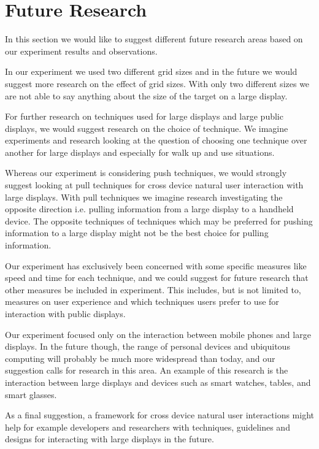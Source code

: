 \section{Future Research} \label{sec:futureresearch}
In this section we would like to suggest different future research areas based on our experiment results and observations.

In our experiment we used two different grid sizes and in the future we would suggest more research on the effect of grid sizes.
With only two different sizes we are not able to say anything about the size of the target on a large display.

For further research on techniques used for large displays and large public displays, we would suggest research on the choice of technique.
We imagine experiments and research looking at the question of choosing one technique over another for large displays and especially for walk up and use situations.

Whereas our experiment is considering push techniques, we would strongly suggest looking at pull techniques for cross device natural user interaction with large displays.
With pull techniques we imagine research investigating the opposite direction i.e. pulling information from a large display to a handheld device.
The opposite techniques of techniques which may be preferred for pushing information to a large display might not be the best choice for pulling information.

Our experiment has exclusively been concerned with some specific measures like speed and time for each technique, and we could suggest for future research that other measures be included in experiment.
This includes, but is not limited to, measures on user experience and which techniques users prefer to use for interaction with public displays.

Our experiment focused only on the interaction between mobile phones and large displays.
In the future though, the range of personal devices and ubiquitous computing will probably be much more widespread than today, and our suggestion calls for research in this area.
An example of this research is the interaction between large displays and devices such as smart watches, tables, and smart glasses.

As a final suggestion, a framework for cross device natural user interactions might help for example developers and researchers with techniques, guidelines and designs for interacting with large displays in the future.